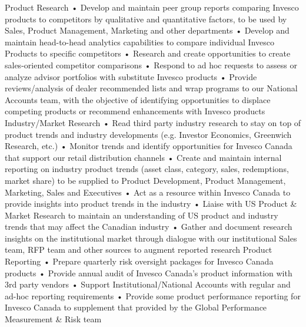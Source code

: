 \documentclass[footinclude, headinclude, letterpaper]{scrartcl}
\begin{document}
\begin{cv}{}
\begin{mycomments}
 Product Research
•	Develop and maintain peer group reports comparing Invesco products to competitors by qualitative and quantitative factors, to be used by Sales, Product Management, Marketing and other departments
•	Develop and maintain head-to-head analytics capabilities to compare individual Invesco Products to specific competitors
•	Research and create opportunities to create sales-oriented competitor comparisons
•	Respond to ad hoc requests to assess or analyze advisor portfolios with substitute Invesco products
•	Provide reviews/analysis of dealer recommended lists and wrap programs to our National Accounts team, with the objective of identifying opportunities to displace competing products or recommend enhancements with Invesco products
Industry/Market Research
•	Read third party industry research to stay on top of product trends and industry developments (e.g. Investor Economics, Greenwich Research, etc.)
•	Monitor trends and identify opportunities for Invesco Canada that support our retail  distribution channels
•	Create and maintain internal reporting on industry product trends (asset class, category, sales, redemptions, market share) to be supplied to Product Development, Product Management, Marketing, Sales and Executives
•	Act as a resource within Invesco Canada to provide insights into product trends in the industry
•	Liaise with US Product & Market Research to maintain an understanding of US product and industry trends that may affect the Canadian industry
•	Gather and document research insights on the institutional market through dialogue with our institutional Sales team, RFP team and other sources to augment reported research
Product Reporting 
•	Prepare quarterly risk oversight packages for Invesco Canada products
•	Provide annual audit of Invesco Canada’s product information with 3rd party vendors
•	Support Institutional/National Accounts with regular and ad-hoc reporting requirements
•	Provide some product performance reporting for Invesco Canada to supplement that provided by the Global Performance Measurement & Risk team
\end{mycomments}



\end{cv}
\end{document}
